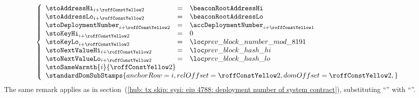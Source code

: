 \item[\underline{\underline{Storing the \inst{BLOCKHASH} in the state:}}] 
	\[
		\left\{ \begin{array}{lclr}
			\stoAddressHi         _{i + \roffTxSkipSysiBlockHashSystemContractStorage} & = & \beaconRootAddressHi                                                      \\
			\stoAddressLo         _{i + \roffTxSkipSysiBlockHashSystemContractStorage} & = & \beaconRootAddressLo                                                      \\
			\stoDeploymentNumber  _{i + \roffTxSkipSysiBlockHashSystemContractStorage} & = & \accDeploymentNumber _{i + \roffTxSkipSysiBlockHashSystemContractAccount} \\
			\stoKeyHi             _{i + \roffTxSkipSysiBlockHashSystemContractStorage} & = & 0                                                                         \\
			\stoKeyLo             _{i + \roffTxSkipSysiBlockHashSystemContractStorage} & = & \locPreviousBlockNumberModuloPrime                                          \\
			\stoNextValueHi       _{i + \roffTxSkipSysiBlockHashSystemContractStorage} & = & \locPreviousBlockHashHi                                                   \\
			\stoNextValueLo       _{i + \roffTxSkipSysiBlockHashSystemContractStorage} & = & \locPreviousBlockHashLo                                                   \\
			\multicolumn{3}{l}{\stoSameWarmth  {i}{\roffTxSkipSysiBlockHashSystemContractStorage} } \\
			\multicolumn{3}{l}{
				\standardDomSubStamps {
					anchorRow = i                                             ,
					relOffset = \roffTxSkipSysiBlockHashSystemContractStorage ,
					domOffset = \roffTxSkipSysiBlockHashSystemContractStorage ,
				}} \\
		\end{array} \right.
	\]
	\saNote{} \label{hub: tx skip: sysi: eip 2935: deployment number of system contract}
	The same remark applies as in
	section~(\ref{hub: tx skip: sysi: eip 4788: deployment number of system contract}),
	substituting
	``\beaconRootAddress''
	with
	``\blockHashAddress''.
